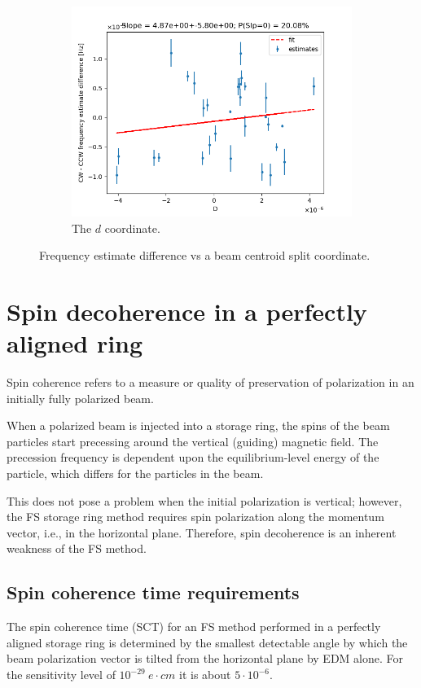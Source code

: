 \documentclass{article}
\begin{document}
\begin{figure}[!h]\ContinuedFloat
  \centering
  \begin{subfigure}[b]{\linewidth}
    \includegraphics[width=\linewidth]{img/spin_axis_motion/multiple/freq_estimates_vs_centroid_diff_D}
    \caption{The $d$ coordinate.}
  \end{subfigure}
  \caption{Frequency estimate difference vs a beam centroid split coordinate.\label{fig:BiasVsCentroid}}
\end{figure}

\section{Spin decoherence in a perfectly aligned ring}
Spin coherence refers to a measure or quality of preservation of polarization in an initially fully polarized beam.~\citep[p.~205]{Eremey:Thesis}

When a polarized beam is injected into a storage ring, the spins of the beam particles start precessing around the vertical (guiding) magnetic field. The precession frequency is dependent upon the equilibrium-level energy of the particle, which differs for the particles in the beam.

This does not pose a problem when the initial polarization is vertical; however, the FS storage ring method requires spin polarization along the momentum vector, i.e., in the horizontal plane. Therefore, spin decoherence is an inherent weakness of the FS method.

\subsection{Spin coherence time requirements}
The spin coherence time (SCT) for an FS method performed in a perfectly aligned storage ring is determined by the smallest detectable angle by which the beam polarization vector is tilted from the horizontal plane by EDM alone. For the sensitivity level of $10^{-29}~e\cdot cm$ it is about $5\cdot10^{-6}$.~\cite{BNL:Deuteron2008}
\end{document}
